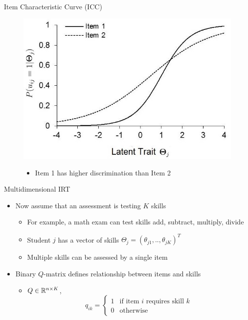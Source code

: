 \documentclass{beamer}
\def \R{\ensuremath \mathbb{R}}
\theoremstyle{definition}
\begin{document}
\begin{frame}{Item Characteristic Curve (ICC)}
\begin{figure}
  \centering
  \includegraphics[width=.7\textwidth]{../img/logistic_2param_icc.jpg}
  \begin{itemize}
    \item Item 1 has higher discrimination than Item 2
  \end{itemize}
\end{figure}

\end{frame}
\begin{frame}{Multidimensional IRT}
\begin{itemize}
  \item Now assume that an assessment is testing $K$ skills
  \begin{itemize}
    \item For example, a math exam can test skills add, subtract, multiply, divide
    \item Student $j$ has a vector of skills $\Theta_j = (\theta_{j1},.., \theta_{jK})^T$
    \item Multiple skills can be assessed by a single item
  \end{itemize}
  \item<2-> Binary $Q$-matrix defines relationship between items and skills
  \begin{itemize}
    \item<2-> $Q \in \R^{n \times K}$, \[q_{ik} = \begin{cases}
    1 & \text{if item } i \text{ requires skill } k \\ 
    0 & \text{otherwise} 
    \end{cases}\]
  \end{itemize}
\end{itemize}
\end{frame}
\end{document}
